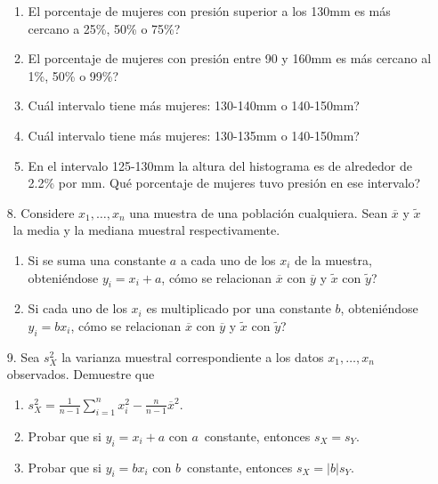 \documentclass[11pt,a4paper,twoside]{article}%
\begin{document}
\begin{enumerate}
\begin{enumerate}
\item \textquestiondown El porcentaje de mujeres con presi\'{o}n superior a
los 130mm es m\'{a}s cercano a 25\%, 50\% o 75\%?

\item \textquestiondown El porcentaje de mujeres con presi\'{o}n entre 90 y
160mm es m\'{a}s cercano al 1\%, 50\% o 99\%?

\item \textquestiondown Cu\'{a}l intervalo tiene m\'{a}s mujeres: 130-140mm o 140-150mm?

\item \textquestiondown Cu\'{a}l intervalo tiene m\'{a}s mujeres: 130-135mm o 140-150mm?

\item En el intervalo 125-130mm la altura del histograma es de alrededor de
2.2\% por mm. \textquestiondown Qu\'{e} porcentaje de mujeres tuvo presi\'{o}n
en ese intervalo?
\end{enumerate}

\item[8.] Considere $x_{1},\ldots,x_{n}$ una muestra de una poblaci\'{o}n
cualquiera. Sean $\overline{x}$ y $\widetilde{x}$\ la media y la mediana
muestral respectivamente.

\begin{enumerate}
\item Si se suma una constante $a$ a cada uno de los $x_{i}$ de la muestra,
obteni\'{e}ndose $y_{i}=x_{i}+a$, \textquestiondown c\'{o}mo se relacionan
$\overline{x}$ con $\overline{y}$ y $\widetilde{x}$ con $\widetilde{y}$?

\item Si cada uno de los $x_{i}$ es multiplicado por una constante $b$,
obteni\'{e}ndose $y_{i}=bx_{i}$, \textquestiondown c\'{o}mo se relacionan
$\overline{x}$ con $\overline{y}$ y $\widetilde{x}$ con $\widetilde{y}$?
\end{enumerate}

\item[9.] Sea $s_{X}^{2}$ la varianza muestral correspondiente a los datos
$x_{1},\ldots,x_{n}$ observados. Demuestre que

\begin{enumerate}
\item $s_{X}^{2}=\frac{1}{n-1}\sum_{i=1}^{n}x_{i}^{2}-\frac{n}{n-1}%
\overline{x}^{2}$.

\item Probar que si $y_{i}=x_{i}+a$ con $a$\ constante, entonces $s_{X}=s_{Y}$.

\item Probar que si $y_{i}=bx_{i}$ con $b$\ constante, entonces $s_{X}%
=\left\vert b\right\vert s_{Y}$.
\end{enumerate}
\end{enumerate}
\end{document}
